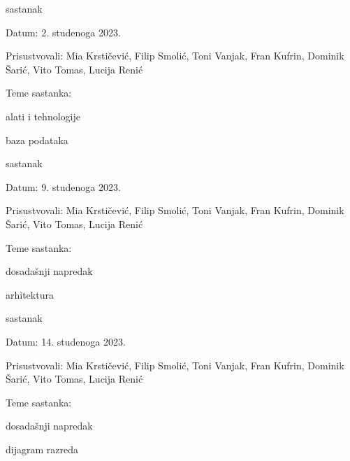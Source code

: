 \begin{packed_enum}
			\item  sastanak
			\item[] \begin{packed_item}
				\item Datum: 2. studenoga 2023.
				\item Prisustvovali: Mia Krstičević, Filip Smolić, Toni Vanjak, Fran Kufrin, Dominik Šarić, Vito Tomas, Lucija Renić
				\item Teme sastanka:
				\begin{packed_item}
					\item  alati i tehnologije
					\item baza podataka
				\end{packed_item}
			\end{packed_item}
			
			\item  sastanak
			\item[] \begin{packed_item}
				\item Datum: 9. studenoga 2023.
				\item Prisustvovali: Mia Krstičević, Filip Smolić, Toni Vanjak, Fran Kufrin, Dominik Šarić, Vito Tomas, Lucija Renić
				\item Teme sastanka:
				\begin{packed_item}
					\item dosadašnji napredak
					\item arhitektura
				\end{packed_item}
			\end{packed_item}
			
			\item  sastanak
			\item[] \begin{packed_item}
				\item Datum: 14. studenoga 2023.
				\item Prisustvovali: Mia Krstičević, Filip Smolić, Toni Vanjak, Fran Kufrin, Dominik Šarić, Vito Tomas, Lucija Renić
				\item Teme sastanka:
				\begin{packed_item}
					\item dosadašnji napredak
					\item dijagram razreda
				\end{packed_item}
			\end{packed_item}
			
			
		\end{packed_enum}
		
